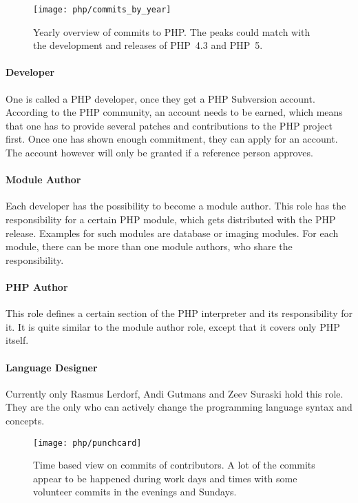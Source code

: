 \begin{figure}[htbp]
  \centering
  \texttt{[image: php/commits\_by\_year]}
  \caption[Commits by Year, PHP]
  {Yearly overview of commits to PHP. The peaks could match with the
    development and releases of PHP~4.3 and PHP~5.}
\end{figure}

\paragraph{Developer}

One is called a PHP developer, once they get a PHP Subversion account.
According to the PHP community, an account needs to be earned, which means that
one has to provide several patches and contributions to the PHP project first.
Once one has shown enough commitment, they can apply for an account. The
account however will only be granted if a reference person approves.

\paragraph{Module Author}

Each developer has the possibility to become a module author. This role has the
responsibility for a certain PHP module, which gets distributed with the PHP
release. Examples for such modules are database or imaging modules. For each
module, there can be more than one module authors, who share the
responsibility.

\paragraph{PHP Author}

This role defines a certain section of the PHP interpreter and its
responsibility for it. It is quite similar to the module author role, except
that it covers only PHP itself.

\paragraph{Language Designer}

Currently only Rasmus Lerdorf, Andi Gutmans and Zeev Suraski hold this role.
They are the only who can actively change the programming language syntax and
concepts.

\begin{figure}[hbtp]
  \centering
  \texttt{[image: php/punchcard]}
  \caption[Time Based View on Commits, PHP]
  {Time based view on commits of contributors. A lot of the commits appear to
    be happened during work days and times with some volunteer commits in the
    evenings and Sundays.}
\end{figure}

